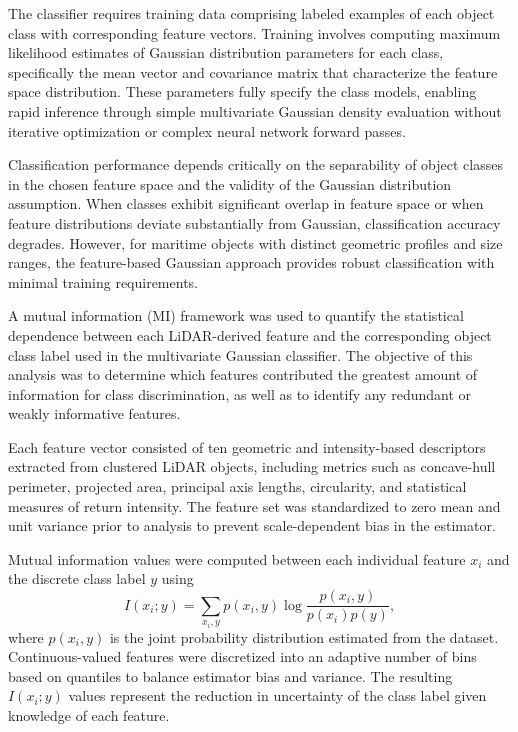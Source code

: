 The classifier requires training data comprising labeled examples of each object class with corresponding feature vectors.
Training involves computing maximum likelihood estimates of Gaussian distribution parameters for each class, specifically the mean vector and covariance matrix that characterize the feature space distribution.
These parameters fully specify the class models, enabling rapid inference through simple multivariate Gaussian density evaluation without iterative optimization or complex neural network forward passes.

Classification performance depends critically on the separability of object classes in the chosen feature space and the validity of the Gaussian distribution assumption.
When classes exhibit significant overlap in feature space or when feature distributions deviate substantially from Gaussian, classification accuracy degrades.
However, for maritime objects with distinct geometric profiles and size ranges, the feature-based Gaussian approach provides robust classification with minimal training requirements.



A mutual information (MI) framework was used to quantify the statistical dependence between each LiDAR-derived feature and the corresponding object class label used in the multivariate Gaussian classifier. 
The objective of this analysis was to determine which features contributed the greatest amount of information for class discrimination, as well as to identify any redundant or weakly informative features.

Each feature vector consisted of ten geometric and intensity-based descriptors extracted from clustered LiDAR objects, including metrics such as concave-hull perimeter, projected area, principal axis lengths, circularity, and statistical measures of return intensity. 
The feature set was standardized to zero mean and unit variance prior to analysis to prevent scale-dependent bias in the estimator.

Mutual information values were computed between each individual feature $x_i$ and the discrete class label $y$ using
\[
I(x_i; y) = \sum_{x_i,y} p(x_i, y) \log \frac{p(x_i, y)}{p(x_i) p(y)},
\]
where $p(x_i, y)$ is the joint probability distribution estimated from the dataset.
Continuous-valued features were discretized into an adaptive number of bins based on quantiles to balance estimator bias and variance.
The resulting $I(x_i; y)$ values represent the reduction in uncertainty of the class label given knowledge of each feature.

